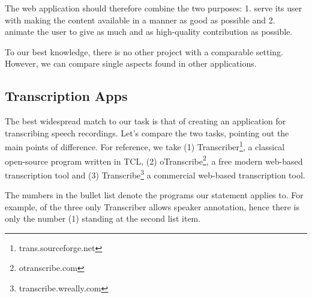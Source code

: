 \documentclass{svproc}
\begin{document}
The web application should therefore combine the two purposes: 1. serve its user
with making the content available in a manner as good as possible and 2. animate
the user to give as much and as high-quality contribution as possible.

To our best knowledge, there is no other project with a comparable setting.
However, we can compare single aspects found in other applications.

\subsection{Transcription Apps}
\label{ssec:diff:trans}

The best widespread match to our task is that of creating an application for
transcribing speech recordings. Let's compare the two tasks, pointing out the
main points of difference. For reference, we take (1)
Transcriber\footnote{trans.sourceforge.net}, a classical open-source program
written in TCL, (2) oTranscribe\footnote{otranscribe.com}, a free modern
web-based transcription tool and (3) Transcribe\footnote{transcribe.wreally.com}
a commercial web-based transcription tool.

The numbers in the bullet list denote the programs our statement applies to. For
example, of the three only Transcriber allows speaker annotation, hence there is
only the number (1) standing at the second list item.
\end{document}
